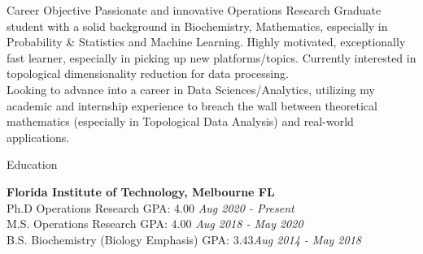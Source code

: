 \documentclass{resume} %
\begin{document}

\begin{rSection}{Career Objective}
    Passionate and innovative Operations Research Graduate student with a solid background in Biochemistry, Mathematics, especially in Probability \& Statistics and Machine Learning. 
    Highly motivated, exceptionally fast learner, especially in picking up new platforms/topics. 
    Currently interested in topological dimensionality reduction for data processing.\\
    Looking to advance into a career in Data Sciences/Analytics, 
    utilizing my academic and internship experience to breach the wall between theoretical mathematics (especially in Topological Data Analysis) and real-world applications.
\end{rSection}




\begin{rSection}{Education}

    {\bf Florida Institute of Technology, Melbourne FL}
    \\ Ph.D Operations Research  GPA: 4.00 \hfill {\em Aug 2020 - Present}
    \\ M.S. Operations Research  GPA: 4.00 \hfill {\em Aug 2018 - May 2020}
    \\ B.S. Biochemistry (Biology Emphasis)    GPA: 3.43\hfill {\em Aug 2014 - May 2018}
\end{rSection}

\end{document}
